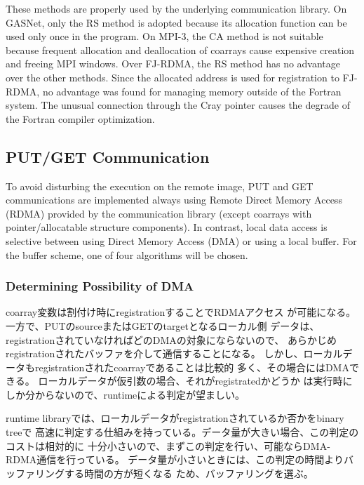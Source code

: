 These methods are properly used by the underlying communication library.
%
On GASNet, only the RS method is adopted because its allocation function
can be used only once in the program.
%
On MPI-3, the CA method is not suitable because frequent 
allocation and deallocation of coarrays cause expensive creation and freeing 
MPI windows.
%
Over FJ-RDMA, the RS method has no advantage over the other methods.
Since the allocated address is used for registration to FJ-RDMA, 
no advantage was found for managing memory outside of the Fortran system. 
The unusual connection through the Cray pointer causes the degrade of 
the Fortran compiler optimization.


\subsection{PUT/GET Communication}\label{sec:putget}

To avoid disturbing the execution on the remote image, PUT and GET communications
are implemented always using Remote Direct Memory Access (RDMA) provided by 
the communication library (except coarrays with pointer/allocatable structure components). 
In contrast, local data access is selective between using Direct Memory Access (DMA) or
using a local buffer. For the buffer scheme, one of four algorithms will be chosen.


\subsubsection{Determining Possibility of DMA}

coarray変数は割付け時にregistrationすることでRDMAアクセス
が可能になる。一方で、PUTのsourceまたはGETのtargetとなるローカル側
データは、registrationされていなければどのDMAの対象にならないので、
あらかじめregistrationされたバッファを介して通信することになる。
しかし、ローカルデータもregistrationされたcoarrayであることは比較的
多く、その場合にはDMAできる。
ローカルデータが仮引数の場合、それがregistratedかどうか
は実行時にしか分からないので、runtimeによる判定が望ましい。

runtime libraryでは、ローカルデータがregistrationされているか否かをbinary treeで
高速に判定する仕組みを持っている。データ量が大きい場合、この判定のコストは相対的に
十分小さいので、まずこの判定を行い、可能ならDMA-RDMA通信を行っている。
データ量が小さいときには、この判定の時間よりバッファリングする時間の方が短くなる
ため、バッファリングを選ぶ。


